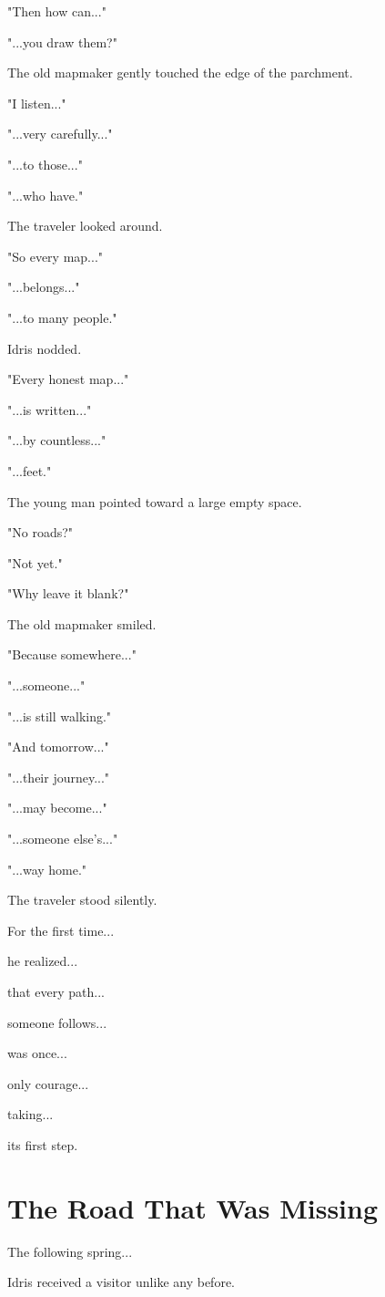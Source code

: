 \documentclass[12pt,openany]{book}
\begin{document}
"Then how can..."

"...you draw them?"

The old mapmaker gently touched the edge of the parchment.

"I listen..."

"...very carefully..."

"...to those..."

"...who have."

The traveler looked around.

"So every map..."

"...belongs..."

"...to many people."

Idris nodded.

"Every honest map..."

"...is written..."

"...by countless..."

"...feet."

The young man pointed toward a large empty space.

"No roads?"

"Not yet."

"Why leave it blank?"

The old mapmaker smiled.

"Because somewhere..."

"...someone..."

"...is still walking."

"And tomorrow..."

"...their journey..."

"...may become..."

"...someone else's..."

"...way home."

The traveler stood silently.

For the first time...

he realized...

that every path...

someone follows...

was once...

only courage...

taking...

its first step.
\section*{The Road That Was Missing}

The following spring...

Idris received a visitor unlike any before.
\end{document}
